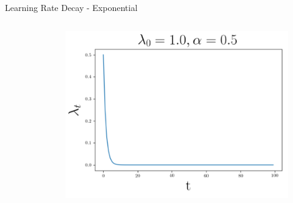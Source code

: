 \documentclass{beamer}
\begin{document}
\begin{frame}
\begin{block}{Learning Rate Decay - Exponential}
\begin{columns}
\begin{column}{0.3 \textwidth}
\begin{figure}
				\end{figure}
			\end{column}
			\begin{column}{0.3 \textwidth}
				\begin{figure}
					\centering
					\includegraphics[width=1\linewidth]{figures/lr_decay6.png}
				\end{figure}
			\end{column}
		\end{columns}
	\end{block}
\end{frame}	
\end{document}
